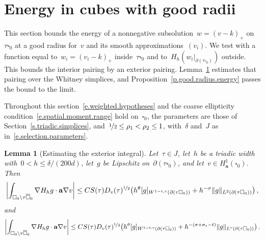 \documentclass[11pt,letterpaper]{article}
\numberwithin{equation}{section}
\newtheorem{lemma}[theorem]{Lemma}
\theoremstyle{definition}
\renewcommand{\a}{\mathbf{a}}
\newcommand{\nf}{\nicefrac}
\newcommand{\cu}{\square}
\DeclarePairedDelimiter{\norm}{\lVert}{\rVert}
\begin{document}
\section{Energy in cubes with good radii}
\label{s.good.radius.energy}

This section bounds the energy of a nonnegative subsolution~$w=(v-k)_+$ on~$\tau\cu_0$ at a good radius for~$v$ and its smooth approximations~$(v_i)$. We test with a function equal to~$w_i=(v_i-k)_+$ inside~$\tau\cu_0$ and to~$H_h(w_i|_{\partial(\tau\cu_0)})$ outside. This bounds the interior pairing by an exterior pairing. Lemma~\ref{l.exterior.integral} estimates that pairing over the Whitney simplices, and Proposition~\ref{p.good.radius.energy} passes the bound to the limit.

\smallskip

Throughout this section~\eqref{e.weighted.hypotheses} and the coarse ellipticity condition~\eqref{e.spatial.moment.range} hold on~$\cu_0$, the parameters are those of Section~\ref{s.triadic.simplices}, and~$\nf12\leq\rho_1<\rho_2\leq1$, with~$\delta$ and~$J$ as in~\eqref{e.selection.parameters}.

\begin{lemma}[Estimating the exterior integral]
\label{l.exterior.integral}
Let~$\tau\in J$, let~$h$ be a triadic width with~$0<h\leq\delta/(200d)$, let~$g$ be Lipschitz on~$\partial(\tau\cu_0)$, and let~$v\in H^1_\a(\cu_0)$. Then
\begin{equation}
	\biggl|\int_{\cu_0\setminus\tau\overline{\cu}_0}\nabla H_hg\cdot\a\nabla v\biggr|\leq C S(\tau)D_v(\tau)^{\nf12}\bigl(h^\theta[g]_{W^{1-t,r}(\partial(\tau\cu_0))}+h^{-\sigma}\norm{g}_{L^2(\partial(\tau\cu_0))}\bigr)\,,
	\label{e.summed.pairing}
\end{equation}
and
\begin{equation}
	\biggl|\int_{\cu_0\setminus\tau\overline{\cu}_0}\nabla H_hg\cdot\a\nabla v\biggr|\leq C S(\tau)D_v(\tau)^{\nf12}\bigl(h^\theta[g]_{W^{1-t,r}(\partial(\tau\cu_0))}+h^{-(\sigma+\sigma_*-t)}\norm{g}_{L^r(\partial(\tau\cu_0))}\bigr)\,.
	\label{e.summed.pairing.lr}
\end{equation}
\end{lemma}
\end{document}
